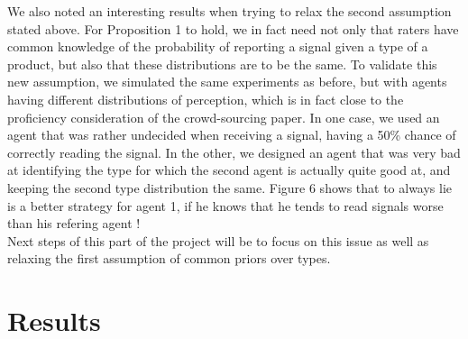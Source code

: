 \documentclass{scrartcl}
\begin{document}
We also noted an interesting results when trying to relax the second assumption stated above. For Proposition 1 to hold, we in fact need not only that  raters have common knowledge of the probability of reporting a signal given a type of a product, but also that these distributions are to be the same. To validate this new assumption, we simulated the same experiments as before, but with agents having different distributions of perception, which is in fact close to the proficiency consideration of the crowd-sourcing paper. In one case, we used an agent that was rather undecided when receiving a signal, having a 50\% chance of correctly reading the signal. In the other, we designed an agent that was very bad at identifying the type for which the second agent is actually quite good at, and keeping the second type distribution the same. Figure 6 shows that to always lie is a better strategy for agent 1, if he knows that he tends to read signals worse than his refering agent !\\ 

Next steps of this part of the project will be to focus on this issue as well as relaxing the first assumption of common priors over types.
\section{Results}
\end{document}

